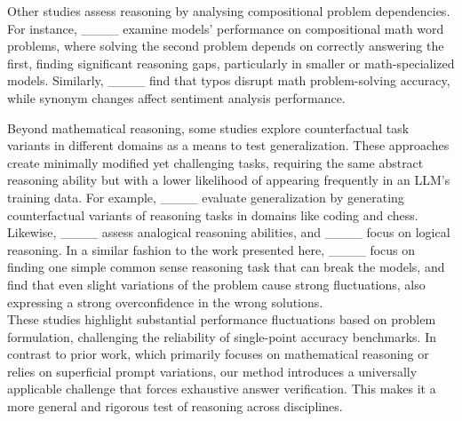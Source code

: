 Other studies assess reasoning by analysing compositional problem dependencies. For instance, ____ examine models' performance on compositional math word problems, where solving the second problem depends on correctly answering the first, finding significant reasoning gaps, particularly in smaller or math-specialized models. Similarly, ____ find that typos disrupt math problem-solving accuracy, while synonym changes affect sentiment analysis performance.

Beyond mathematical reasoning, some studies explore counterfactual task variants in different domains as a means to test generalization. These approaches create minimally modified yet challenging tasks, requiring the same abstract reasoning ability but with a lower likelihood of appearing frequently in an LLM’s training data. For example, ____ evaluate generalization by generating counterfactual variants of reasoning tasks in domains like coding and chess. Likewise, ____ assess analogical reasoning abilities, and ____ focus on logical reasoning. In a similar fashion to the work presented here, ____ focus on finding one simple common sense reasoning task that can break the models, and find that even slight variations of the problem cause strong fluctuations, also expressing a strong overconfidence in the wrong solutions.\\

These studies highlight substantial performance fluctuations based on problem formulation, challenging the reliability of single-point accuracy benchmarks. In contrast to prior work, which primarily focuses on mathematical reasoning or relies on superficial prompt variations, our method introduces a universally applicable challenge that forces exhaustive answer verification. This makes it a more general and rigorous test of reasoning across disciplines.